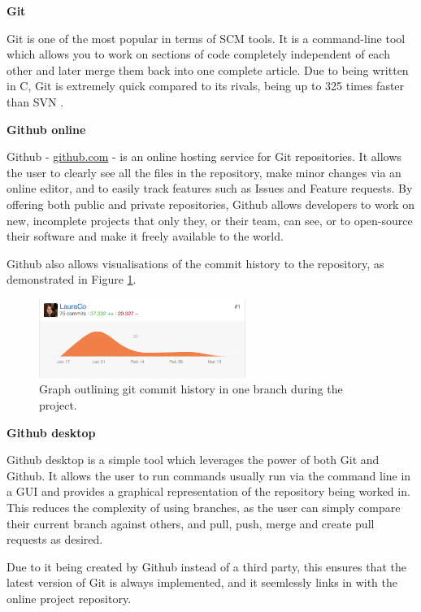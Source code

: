 \noindent \textbf{Git}

Git \cite{2014gits} is one of the most popular in terms of \acrfull{SCM} tools. It is a command-line tool which allows you to work on sections of code completely independent of each other and later merge them back into one complete article. Due to being written in C, Git is extremely quick compared to its rivals, being up to 325 times faster than \acrfull{SVN} \cite{About_Git}.

\noindent \textbf{Github online}

Github \cite{github} - \url{github.com} - is an online hosting service for Git repositories. It allows the user to clearly see all the files in the repository, make minor changes via an online editor, and to easily track features such as Issues and Feature requests. By offering both public and private repositories, Github allows developers to work on new, incomplete projects that only they, or their team, can see, or to open-source their software and make it freely available to the world.

Github also allows visualisations of the commit history to the repository, as demonstrated in Figure \ref{fig:git-graph}.

\begin{figure}[H]
  \centering
  \includegraphics[width=0.6\textwidth]{Chapter2/tools/git_graph.png}
  \caption{Graph outlining git commit history in one branch during the project.}
  \label{fig:git-graph}
\end{figure}

\noindent \textbf{Github desktop}

Github desktop \cite{github_desktop} is a simple tool which leverages the power of both Git and Github. It allows the user to run commands usually run via the command line in a \acrshort{GUI} and provides a graphical representation of the repository being worked in. This reduces the complexity of using branches, as the user can simply compare their current branch against others, and pull, push, merge and create pull requests as desired.

Due to it being created by Github instead of a third party, this ensures that the latest version of Git is always implemented, and it seemlessly links in with the online project repository.

